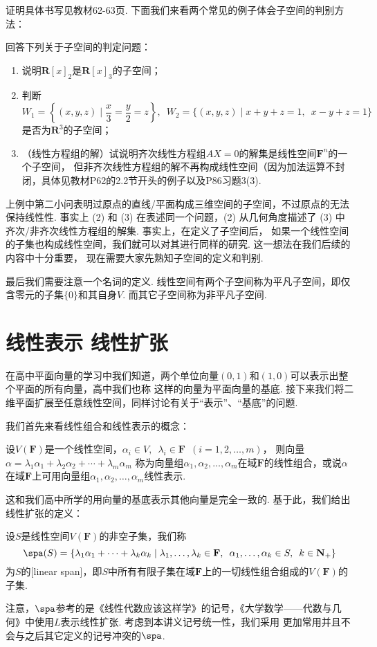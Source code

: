 证明具体书写见教材62-63页. 下面我们来看两个常见的例子体会子空间的判别方法：
\begin{example}\label{ex:2:常见子空间}
    回答下列关于子空间的判定问题：
    \begin{enumerate}[label=(\arabic*)]
        \item 说明$\mathbf{R}[x]_2$是$\mathbf{R}[x]_3$的子空间；

        \item 判断$W_1=\left\{(x,y,z) \mid \dfrac{x}{3}=\dfrac{y}{2}=z\right\},\enspace
            W_2=\{(x,y,z) \mid x+y+z=1,\enspace x-y+z=1\}$是否为$\mathbf{R}^3$的子空间；

        \item （线性方程组的解）试说明齐次线性方程组$AX=0$的解集是线性空间$\mathbf{F}^n$的一个子空间，
        但非齐次线性方程组的解不再构成线性空间（因为加法运算不封闭，具体见教材P62的2.2节开头的例子以及P86习题3(3).
    \end{enumerate}
\end{example}

上例中第二小问表明过原点的直线/平面构成三维空间的子空间，不过原点的无法保持线性性. 事实上 (2) 和 (3)
在表述同一个问题，(2) 从几何角度描述了 (3) 中齐次/非齐次线性方程组的解集. 事实上，在定义了子空间后，
如果一个线性空间的子集也构成线性空间，我们就可以对其进行同样的研究. 这一想法在我们后续的内容中十分重要，
现在需要大家先熟知子空间的定义和判别.

最后我们需要注意一个名词的定义. 线性空间有两个子空间称为平凡子空间，即仅含零元的子集$\{0\}$和其自身$V$.
而其它子空间称为非平凡子空间.

\section{线性表示 \quad 线性扩张}
在高中平面向量的学习中我们知道，两个单位向量$(0,1)$和$(1,0)$可以表示出整个平面的所有向量，高中我们也称
这样的向量为平面向量的基底. 接下来我们将二维平面扩展至任意线性空间，同样讨论有关于``表示''、``基底''的问题.

我们首先来看线性组合和线性表示的概念：
\begin{definition}
    设$V(\mathbf{F})$是一个线性空间，$\alpha_i\in V,\enspace\lambda_i\in \mathbf{F}\enspace(i=1,2,\ldots,m)$，
    则向量$\alpha=\lambda_1\alpha_1+\lambda_2\alpha_2+\cdots+\lambda_m\alpha_m$
    称为向量组$\alpha_1,\alpha_2,\ldots,\alpha_m$在域$\mathbf{F}$的线性组合，或说$\alpha$
    在域$\mathbf{F}$上可用向量组$\alpha_1,\alpha_2,\ldots,\alpha_m$线性表示.
\end{definition}
这和我们高中所学的用向量的基底表示其他向量是完全一致的. 基于此，我们给出线性扩张的定义：
\begin{definition}
    设$S$是线性空间$V(\mathbf{F})$的非空子集，我们称
    \[ \spa(S)=\{\lambda_1\alpha_1+\cdots+\lambda_k\alpha_k \mid \lambda_1,\ldots,\lambda_k\in\mathbf{F},\enspace\alpha_1,\ldots,\alpha_k\in S,\enspace k\in\mathbf{N_+}\} \]
    为$S$的[linear span]，即$S$中所有有限子集在域$\mathbf{F}$上的一切线性组合组成的$V(\mathbf{F})$的子集.
\end{definition}
注意，$\spa$参考的是《线性代数应该这样学》的记号，《大学数学——代数与几何》中使用$L$表示线性扩张. 考虑到本讲义记号统一性，我们采用
更加常用并且不会与之后其它定义的记号冲突的$\spa$.

